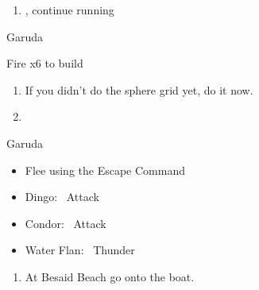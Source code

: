\begin{enumerate}[resume]
  \item \sd, continue running
\end{enumerate}
\begin{battle}{Garuda}
  \begin{itemize}
    \summon{\valefor}
    \valeforf Fire x6 to build \od
  \end{itemize}
\end{battle}
\begin{enumerate}[resume]
  \item If you didn't do the sphere grid yet, do it now.
  \item \formation{\tidus}{\yuna}{\lulu}
\end{enumerate}
\begin{battle}{Garuda}
  \begin{itemize}
    \item Flee using the Escape Command
  \end{itemize}
\end{battle}
\begin{encounters}
  \begin{itemize}
    \item Dingo: \tidus\ Attack
    \item Condor: \wakka\ Attack
    \item Water Flan: \lulu\ Thunder
  \end{itemize}
\end{encounters}
\begin{enumerate}[resume]
  \item At Besaid Beach go onto the boat.
\end{enumerate}